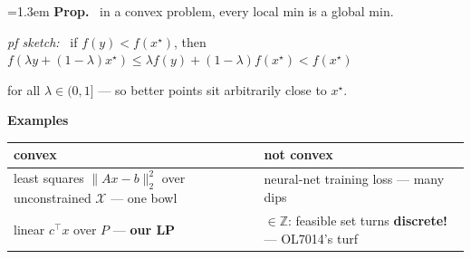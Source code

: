 \documentclass[10pt]{article}
\newenvironment{board}{%
  \par\vspace{4pt}
  \begingroup\leftskip=1.3em\relax\parskip=2pt\relax}{%
  \par\endgroup\vspace{4pt}}
\begin{document}
\begin{board}
\textbf{Prop.} \ in a convex problem, every local min is a global min.
\vspace{1pt}

\quad \emph{pf sketch:} \ if $f(y) < f(x^{\star})$, then $f(\lambda y + (1-\lambda)x^{\star})
      \le \lambda f(y) + (1-\lambda) f(x^{\star}) < f(x^{\star})$
\vspace{1pt}

\quad\qquad for all $\lambda \in (0,1]$ --- so better points sit arbitrarily close to $x^{\star}$.
\vspace{4pt}

\textbf{Examples}
\vspace{3pt}

\begin{tabular}{@{}l|l@{}}
 convex & not convex \\ \hline
 least squares $\|Ax-b\|_2^2$ over unconstrained $\mathcal{X}$ --- one bowl & neural-net training loss --- many dips \\
 linear $c^{\top}x$ over $P$ --- \textbf{our LP} & $\in \mathbb{Z}$: feasible set turns \textbf{discrete!} --- OL7014's turf \\
\end{tabular}
\end{board}
\end{document}
